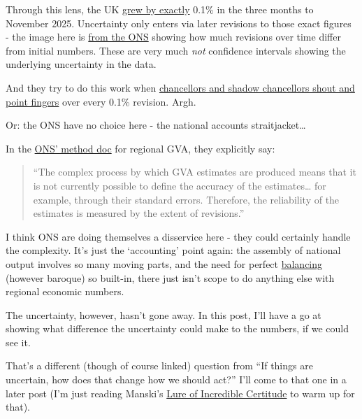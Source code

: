 \documentclass[
  letterpaper,
  DIV=11,
  numbers=noendperiod]{scrartcl}
\begin{document}
Through this lens, the UK
\href{https://www.ons.gov.uk/economy/grossdomesticproductgdp/bulletins/gdpmonthlyestimateuk/november2025}{grew
by exactly} 0.1\% in the three months to November 2025. Uncertainty only
enters via later revisions to those exact figures - the image here is
\href{https://www.ons.gov.uk/economy/grossdomesticproductgdp/articles/communicatinggrossdomesticproduct/2020-04-16}{from
the ONS} showing how much revisions over time differ from initial
numbers. These are very much \emph{not} confidence intervals showing the
underlying uncertainty in the data.

And they try to do this work when
\href{https://www.bbc.co.uk/news/articles/cwyp7v7r28yo}{chancellors and
shadow chancellors shout and point fingers} over every 0.1\% revision.
Argh.

Or: the ONS have no choice here - the national accounts
straitjacket\ldots{}

In the
\href{https://www.ons.gov.uk/economy/grossvalueaddedgva/methodologies/regionalgrossvalueaddedbalancedqmi}{ONS'
method doc} for regional GVA, they explicitly say:

\begin{quote}
``The complex process by which GVA estimates are produced means that it
is not currently possible to define the accuracy of the
estimates\ldots{} for example, through their standard errors. Therefore,
the reliability of the estimates is measured by the extent of
revisions.''
\end{quote}

I think ONS are doing themselves a disservice here - they could
certainly handle the complexity. It's just the `accounting' point again:
the assembly of national output involves so many moving parts, and the
need for perfect
\href{https://www.ons.gov.uk/economy/grossdomesticproductgdp/articles/recentchallengesofbalancingthethreeapproachesofgdp/2022-04-20}{balancing}
(however baroque) so built-in, there just isn't scope to do anything
else with regional economic numbers.

The uncertainty, however, hasn't gone away. In this post, I'll have a go
at showing what difference the uncertainty could make to the numbers, if
we could see it.

That's a different (though of course linked) question from ``If things
are uncertain, how does that change how we should act?'' I'll come to
that one in a later post (I'm just reading Manski's
\href{https://www.cambridge.org/core/journals/economics-and-philosophy/article/abs/lure-of-incredible-certitude/A1F09783377B05F20B83543CD40C7639}{Lure
of Incredible Certitude} to warm up for that).
\end{document}
